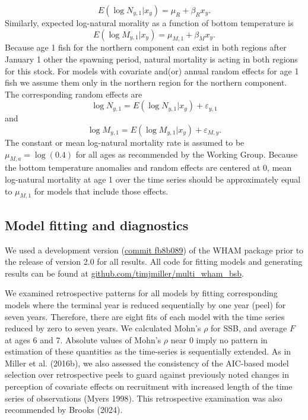 \documentclass[
]{article}
\begin{document}
\begin{equation}\label{eq:expected-recruitment}
E\left(\log N_{y,1}|x_y\right) = \mu_{R} + \beta_{R} x_y.
\end{equation}
Similarly, expected log-natural morality as a function of bottom temperature is
\begin{equation}\label{eq:expected-M1}
E\left(\log M_{y,1}|x_y\right) = \mu_{M,1} + \beta_{M} x_y.
\end{equation}
Because age 1 fish for the northern component can exist in both regions after January 1 other the spawning period, natural mortality is acting in both regions for this stock. For models with covariate and(or) annual random effects for age 1 fish we assume them only in the northern region for the northern component. The corresponding random effects are
\begin{equation}\label{eq:Rec-re}
\log N_{y,1} = E\left(\log N_{y,1}|x_y\right) + \varepsilon_{y,1}
\end{equation}
and
\begin{equation}\label{eq:M-re}
\log M_{y,1} = E\left(\log M_{y,1}|x_y\right) + \varepsilon_{M,y}.
\end{equation}
The constant or mean log-natural mortality rate is assumed to be \(\mu_{M,a} = \log(0.4)\) for all ages as recommended by the Working Group. Because the bottom temperature anomalies and random effects are centered at 0, mean log-natural mortality at age 1 over the time series should be approximately equal to \(\mu_{M,1}\) for models that include those effects.

\hypertarget{model-fitting-and-diagnostics}{%
\subsection*{Model fitting and diagnostics}\label{model-fitting-and-diagnostics}}

We used a development version (\href{https://github.com/timjmiller/wham/tree/fb8b089}{commit fb8b089}) of the WHAM package prior to the release of version 2.0 for all results. All code for fitting models and generating results can be found at \href{https://github.com/timjmiller/multi_wham_bsb}{github.com/timjmiller/multi\_wham\_bsb}.

We examined retrospective patterns for all models by fitting corresponding models where the terminal year is reduced sequentially by one year (peel) for seven years. Therefore, there are eight fits of each model with the time series reduced by zero to seven years. We calculated Mohn's \(\rho\) for SSB, and average \(F\) at ages 6 and 7. Absolute values of Mohn's \(\rho\) near 0 imply no pattern in estimation of these quantities as the time-series is sequentially extended. As in Miller et al. (2016b), we also assessed the consistency of the AIC-based model selection over retrospective peels to guard against previously noted changes in perception of covariate effects on recruitment with increased length of the time series of observations (Myers 1998). This retrospective examination was also recommended by Brooks (2024).
\end{document}
